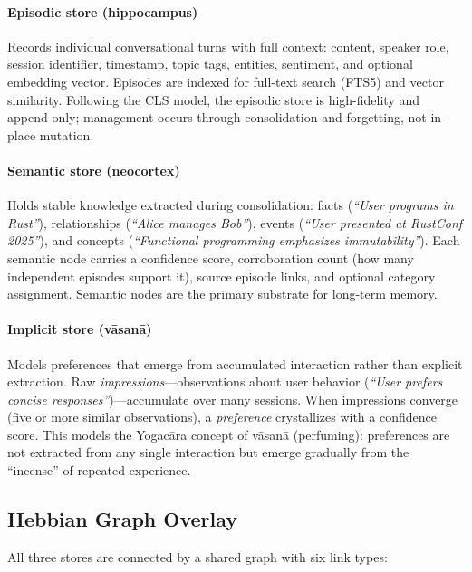 \paragraph{Episodic store (hippocampus)}
Records individual conversational turns with full context: content, speaker
role, session identifier, timestamp, topic tags, entities, sentiment, and
optional embedding vector. Episodes are indexed for full-text search (FTS5)
and vector similarity. Following the CLS model, the episodic store is
high-fidelity and append-only; management occurs through consolidation and
forgetting, not in-place mutation.

\paragraph{Semantic store (neocortex)}
Holds stable knowledge extracted during consolidation: facts
(\emph{``User programs in Rust''}), relationships (\emph{``Alice manages
Bob''}), events (\emph{``User presented at RustConf 2025''}), and concepts
(\emph{``Functional programming emphasizes immutability''}). Each semantic
node carries a confidence score, corroboration count (how many independent
episodes support it), source episode links, and optional category assignment.
Semantic nodes are the primary substrate for long-term memory.

\paragraph{Implicit store (v\=asan\=a)}
Models preferences that emerge from accumulated interaction rather than
explicit extraction. Raw \emph{impressions}---observations about user
behavior (\emph{``User prefers concise responses''})---accumulate over many
sessions. When impressions converge (five or more similar observations), a
\emph{preference} crystallizes with a confidence score. This models the
Yogac\=ara concept of v\=asan\=a (perfuming): preferences are not extracted
from any single interaction but emerge gradually from the ``incense'' of
repeated experience.

\subsection{Hebbian Graph Overlay}
\label{sec:graph}

All three stores are connected by a shared graph with six link types:

